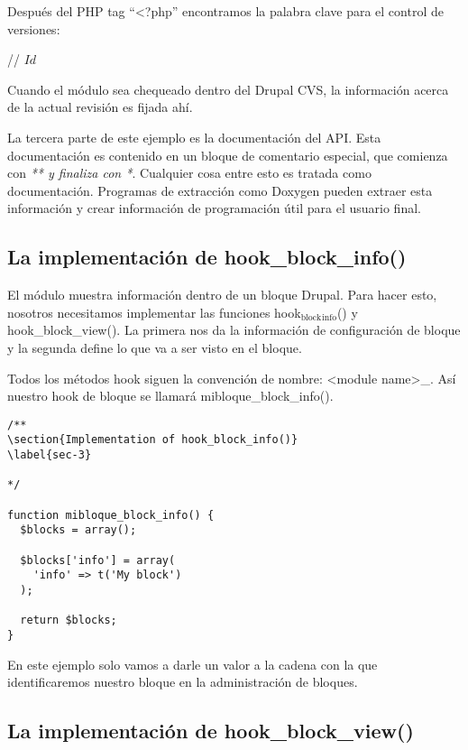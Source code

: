 \documentclass[11pt]{article}
\begin{document}
Después del PHP tag ``<?php'' encontramos la palabra clave para el
control de versiones: 

// $Id$ 

Cuando el módulo sea chequeado dentro del Drupal CVS, la información
acerca de la actual revisión es fijada ahí.  

La tercera parte de este ejemplo es la documentación del API. Esta
documentación es contenido en un bloque de comentario especial, que
comienza con \emph{** y finaliza con *}. Cualquier cosa entre esto es
tratada como documentación. Programas de extracción como Doxygen
pueden extraer esta información y crear información de programación
útil para el usuario final.

\subsection{La implementación de hook\_block\_info()}
\label{sec-2.9}


El módulo muestra información dentro de un bloque Drupal. Para hacer
esto, nosotros necesitamos implementar las funciones hook$_{\mathrm{block}}$$_{\mathrm{info}}$()
y hook\_block\_view(). La primera nos da la información de configuración
de bloque y la segunda define lo que va a ser visto en el bloque.

Todos los métodos hook siguen la convención de nombre: <module
name>\_<hook name>. Así nuestro hook de bloque se llamará
mibloque\_block\_info().


\begin{verbatim}
/** 
\section{Implementation of hook_block_info()}
\label{sec-3}

*/

function mibloque_block_info() { 
  $blocks = array(); 

  $blocks['info'] = array( 
    'info' => t('My block') 
  ); 

  return $blocks; 
}
\end{verbatim}



En este ejemplo solo vamos a darle un valor a la cadena con la que
identificaremos nuestro bloque en la administración de bloques.

\subsection{La implementación de hook\_block\_view()}
\label{sec-3.1}
\end{document}
